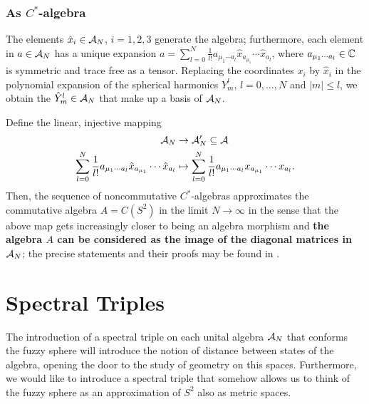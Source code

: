 \subsubsection{As $C^*$-algebra}

The elements $\hat x_i \in \mathcal A_N$, $i = 1, 2, 3$ generate the algebra; furthermore, each element in $a \in \mathcal A_N$ has a unique expansion $a = \sum_{l = 0}^N \frac{1}{l!} a_{\mu_1 \cdots a_l} \hat x_{a_{\mu_1}}  \cdots \hat x_{a_{l}}$, where $a_{\mu_1 \cdots a_l} \in \mathbb{C}$ is symmetric and trace free as a tensor. Replacing the coordinates $x_i$ by $\hat x_i$ in the polynomial expansion of the spherical harmonics $Y^l_m$, $l = 0, \dots, N$ and $|m| \leq l$, we obtain the  $\hat Y^l_m \in \mathcal A_N$ that make up a basis of $\mathcal A_N$.

Define the linear, injective mapping
\begin{align}
    \mathcal A_N &\to \mathcal A'_N \subseteq \mathcal A \\
    \sum_{l = 0}^N \frac{1}{l!} a_{\mu_1 \cdots a_l} \hat x_{a_{\mu_1}}  \cdots \hat x_{a_{l}} &\mapsto \sum_{l = 0}^N \frac{1}{l!} a_{\mu_1 \cdots a_l} x_{a_{\mu_1}}  \cdots x_{a_{l}}.
\end{align}
Then, the sequence of noncommutative $C^*$-algebras approximates the commutative algebra $A = C(S^2)$ in the limit $N \to \infty$ in the sense that the above map gets increasingly closer to being an algebra morphism and \textbf{the algebra $A$ can be considered as the image of the diagonal matrices in $\mathcal A_N$}; the precise statements and their proofs may be found in \cite{Madore}.

\section{Spectral Triples}


The introduction of a spectral triple on each unital algebra $\mathcal A_N$ that conforms the fuzzy sphere will introduce the notion of distance between states of the algebra, opening the door to the study of geometry on this spaces. Furthermore, we would like to introduce a spectral triple that somehow allows us to think of the fuzzy sphere as an approximation of $S^2$ also as metric spaces. 

